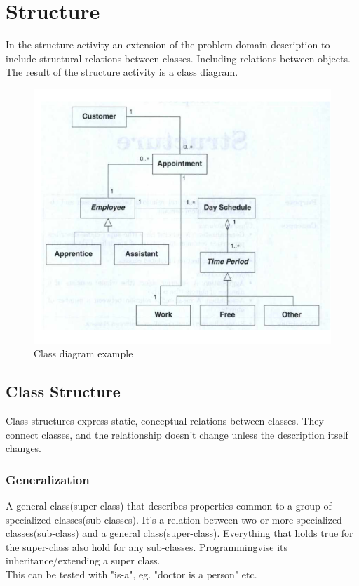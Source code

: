 \chapter{Structure \ooad[71]}\label{chp:structure}
In the structure activity an extension of the problem-domain description to include structural relations between classes. Including relations between objects. The result of the structure activity is a class diagram.

\begin{figure}[H]
    \center
    \includegraphics[width=\linewidth*3/4]{chapters/structure/figures/class_diagram.png}
    \caption{Class diagram example \ooad[72]}
    \label{fig:structure_class_diagram}
\end{figure}

\section{Class Structure}
Class structures express static, conceptual relations between classes. They connect classes, and the relationship doesn't change unless the description itself changes.

\subsection*{Generalization}
A general class(super-class) that describes properties common to a group of specialized classes(sub-classes). It's a relation between two or more specialized classes(sub-class) and a general class(super-class). Everything that holds true for the super-class also hold for any sub-classes. Programmingvise its inheritance/extending a super class.\\
This can be tested with "is-a", eg. "doctor is a person" etc.

